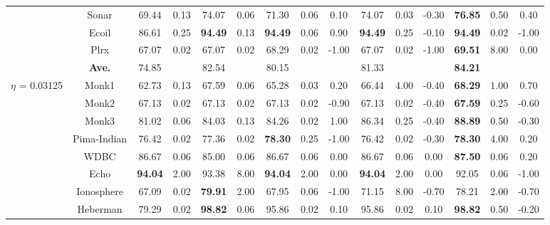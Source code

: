 \documentclass[journal,12pn, onecolumn]{IEEEtran}
\begin{document}
{{{\begin{table}
{{\begin{tabular}{ccccccccccccccc}
    \multicolumn{1}{c}{} & \multicolumn{1}{c}{Sonar} & 69.44  & 0.13  & 74.07  & 0.06  & 71.30  & 0.06  & 0.10  & 74.07  & 0.03  & -0.30  & \textbf{76.85 } & 0.50  & 0.40  \\
    \multicolumn{1}{c}{} & \multicolumn{1}{c}{Ecoil} & 86.61  & 0.25  & \textbf{94.49 } & 0.13  & \textbf{94.49 } & 0.06  & 0.90  & \textbf{94.49 } & 0.25  & -0.10  & \textbf{94.49 } & 0.02  & -1.00  \\
    \multicolumn{1}{c}{} & \multicolumn{1}{c}{Plrx} & 67.07  & 0.02  & 67.07  & 0.02  & 68.29  & 0.02  & -1.00  & 67.07  & 0.02  & -1.00  & \textbf{69.51 } & 8.00  & 0.00  \\
\cmidrule{2-15}    \multicolumn{1}{c}{} & \multicolumn{1}{c}{\textbf{Ave. }} & 74.85  &       & 82.54  &       & 80.15  &       &       & 81.33  &       &       & \textbf{84.21 } &       &  \\
    \midrule
    \multicolumn{1}{c}{\multirow{18}[4]{*}{$\eta$ = 0.03125}} & \multicolumn{1}{c}{Monk1} & 62.73  & 0.13  & 67.59  & 0.06  & 65.28  & 0.03  & 0.20  & 66.44  & 4.00  & -0.40  & \textbf{68.29 } & 1.00  & 0.70  \\
    \multicolumn{1}{c}{} & \multicolumn{1}{c}{Monk2} & 67.13  & 0.02  & 67.13  & 0.02  & 67.13  & 0.02  & -0.90  & 67.13  & 0.02  & -0.40  & \textbf{67.59 } & 0.25  & -0.60  \\
    \multicolumn{1}{c}{} & \multicolumn{1}{c}{Monk3} & 81.02  & 0.06  & 84.03  & 0.13  & 84.26  & 0.02  & 1.00  & 86.34  & 0.25  & -0.40  & \textbf{88.89 } & 0.50  & -0.30  \\
    \multicolumn{1}{c}{} & \multicolumn{1}{c}{Pima-Indian} & 76.42  & 0.02  & 77.36  & 0.02  & \textbf{78.30 } & 0.25  & -1.00  & 76.42  & 0.02  & -0.30  & \textbf{78.30 } & 4.00  & 0.20  \\
    \multicolumn{1}{c}{} & \multicolumn{1}{c}{WDBC} & 86.67  & 0.06  & 85.00  & 0.06  & 86.67  & 0.06  & 0.00  & 86.67  & 0.06  & 0.00  & \textbf{87.50 } & 0.06  & 0.20  \\
    \multicolumn{1}{c}{} & \multicolumn{1}{c}{Echo} & \textbf{94.04 } & 2.00  & 93.38  & 8.00  & \textbf{94.04 } & 2.00  & 0.00  & \textbf{94.04 } & 2.00  & 0.00  & 92.05  & 0.06  & -1.00  \\
    \multicolumn{1}{c}{} & \multicolumn{1}{c}{Ionosphere} & 67.09  & 0.02  & \textbf{79.91 } & 2.00  & 67.95  & 0.06  & -1.00  & 71.15  & 8.00  & -0.70  & 78.21  & 2.00  & -0.70  \\
    \multicolumn{1}{c}{} & \multicolumn{1}{c}{Heberman} & 79.29  & 0.02  & \textbf{98.82 } & 0.06  & 95.86  & 0.02  & 0.10  & 95.86  & 0.02  & 0.10  & \textbf{98.82 } & 0.50  & -0.20  \\

\end{tabular}}}
\end{table}}}}
\end{document}
